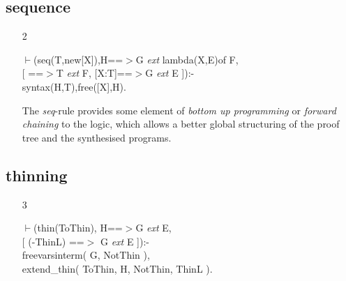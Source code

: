 \documentclass[11pt]{report}
\begin{document}
 \subsection{sequence}
 \begin{enumerate}
 \item[2]
\begin{sf}\begin{tabbing}
$\vdash$(seq(T,new[X]),H==$>$G \mbox{\it ext} lambda(X,E)of F,\\[-0.15ex]
\hspace{2em}[ ==$>$T \mbox{\it ext} F, [X:T]==$>$G \mbox{\it ext} E ]):-\\[-0.15ex]
\hspace{2em}syntax(H,T),free([X],H).
\end{tabbing}\end{sf}

 The \emph{seq}-rule provides some element of \emph{bottom up
 programming} or \emph{forward chaining} to the logic, which 
 allows a better global structuring of the proof tree and the
 synthesised programs. 
 \end{enumerate}
 \subsection{thinning}
 \begin{enumerate}
 \item[3]
\begin{sf}\begin{tabbing}
$\vdash$(thin(ToThin), H==$>$G \mbox{\it ext} E,\\[-0.15ex]
\hspace{2em}[ (-ThinL) ==$>$ G \mbox{\it ext} E ]):-\\[-0.15ex]
\hspace{2em}freevarsinterm( G, NotThin ),\\[-0.15ex]
\hspace{2em}extend\_\hspace{0.1em}thin( ToThin, H, NotThin, ThinL ).
\end{tabbing}\end{sf}

 \end{enumerate}
\end{document}
